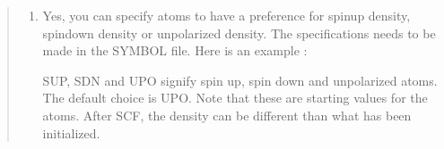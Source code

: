 \documentclass[letterpaper,10pt,english,openany,oneside]{sphinxmanual}
\begin{document}
\begin{quote}
\begin{enumerate}
\begin{description}
\end{description}

\item {} \begin{description}
\sphinxAtStartPar
Yes, you can specify atoms to have a preference for spin\sphinxhyphen{}up density, spin\sphinxhyphen{}down density or unpolarized density. The specifications needs to be made in the SYMBOL file. Here is an example :


\sphinxAtStartPar
SUP, SDN and UPO signify spin up, spin down and unpolarized atoms. The default choice is UPO.
Note that these are starting values for the atoms. After SCF, the density can be different than what has been initialized.

\end{description}

\end{enumerate}
\end{quote}



\renewcommand{\indexname}{Index}
\printindex
\end{document}
